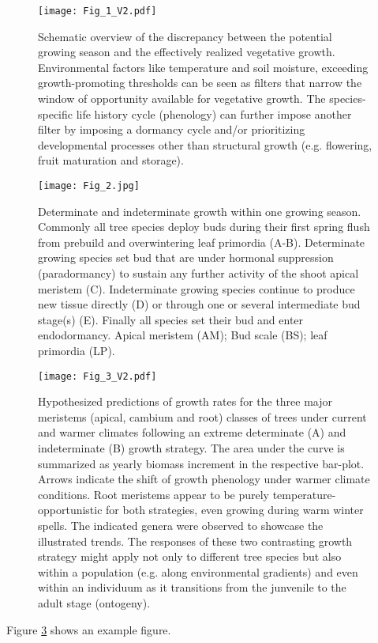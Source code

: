 \documentclass{article}
\begin{document}
	
	\begin{figure}
		\centering
		\texttt{[image: Fig\_1\_V2.pdf]} 
		\caption{Schematic overview of the discrepancy between the potential growing season and the effectively realized vegetative growth. Environmental factors like temperature and soil moisture, exceeding growth-promoting thresholds can be seen as filters that narrow the window of opportunity available for vegetative growth. The species-specific life history cycle (phenology) can further impose another filter by imposing a dormancy cycle and/or prioritizing developmental processes other than structural growth (e.g. flowering, fruit maturation and storage). }
		\label{fig:your-figure-label-xxx}
	\end{figure}
	
		\pagebreak
		
	\begin{figure}
		\centering
		\texttt{[image: Fig\_2.jpg]} 
		\caption{Determinate and indeterminate growth within one growing season. Commonly all tree species deploy buds during their first spring flush from prebuild and overwintering leaf primordia (A-B). Determinate growing species set bud that are under hormonal suppression (paradormancy) to sustain any further activity of the shoot apical meristem (C). Indeterminate growing species continue to produce new tissue directly (D) or through one or several intermediate bud stage(s) (E). Finally all species set their bud and enter endodormancy. Apical meristem (AM); Bud scale (BS); leaf primordia (LP).}
		\label{fig:your-figure-label-xxx}
	\end{figure}
	
		\begin{figure}
		\centering
		\texttt{[image: Fig\_3\_V2.pdf]} 
		\caption{Hypothesized predictions of growth rates for the three major meristems (apical, cambium and root) classes of trees under current and warmer climates following an extreme determinate (A) and indeterminate (B) growth strategy. The area under the curve is summarized as yearly biomass increment in the respective bar-plot. Arrows indicate the shift of growth phenology under warmer climate conditions. Root meristems appear to be purely temperature-opportunistic for both strategies, even growing during warm winter spells. The indicated genera were observed to showcase the illustrated trends. The responses of these two contrasting growth strategy might apply not only to different tree species but also within a population (e.g. along environmental gradients) and even within an individuum as it transitions from the junvenile to the adult stage (ontogeny).}
		\label{fig:your-figure-label-xxx}
	\end{figure}
	
	Figure \ref{fig:your-figure-label-xxx} shows an example figure.
	
		\newpage
	
	
	
	
	
	
\end{document}
